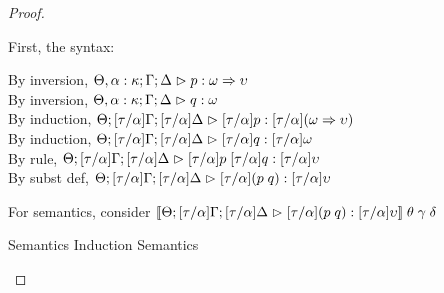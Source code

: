 \begin{proof}
\begin{enumerate}
  First, the syntax:
  \begin{tabbedproof}
    \oo By inversion, $\judgeA[\Theta, \alpha:\kappa; \Gamma; \Delta]{p}{\omega \To \upsilon}$\\
    \oo By inversion, $\judgeA[\Theta, \alpha:\kappa; \Gamma; \Delta]{q}{\omega}$\\
    \oo By induction, $\judgeA[\Theta; {[\tau/\alpha]}\Gamma; {[\tau/\alpha]}\Delta]{{[\tau/\alpha]}p}{{[\tau/\alpha]}(\omega \To \upsilon)}$\\
    \oo By induction, $\judgeA[\Theta; {[\tau/\alpha]}\Gamma; {[\tau/\alpha]}\Delta]{{[\tau/\alpha]}q}{{[\tau/\alpha]}\omega}$\\
    \oo By rule, $\judgeA[\Theta; {[\tau/\alpha]}\Gamma; {[\tau/\alpha]}\Delta]{{[\tau/\alpha]}p\;{[\tau/\alpha]}q}{{[\tau/\alpha]}\upsilon}$\\
    \oo By subst def, $\judgeA[\Theta; {[\tau/\alpha]}\Gamma; {[\tau/\alpha]}\Delta]{{[\tau/\alpha]}(p\;q)}{{[\tau/\alpha]}\upsilon}$\\
  \end{tabbedproof}

  For semantics, consider $\interp{\judgeA[\Theta; 
                                          {[\tau/\alpha]}\Gamma; 
                                          {[\tau/\alpha]}\Delta]
                                          {{[\tau/\alpha]}(p\;q)}
                                          {{[\tau/\alpha]}\upsilon}}
                                 \;\theta\;\gamma\;\delta$
  \begin{eqnproof}
    {Semantics}
    {Induction}
          {Semantics}
  \end{eqnproof}



\end{enumerate}
\end{proof}
